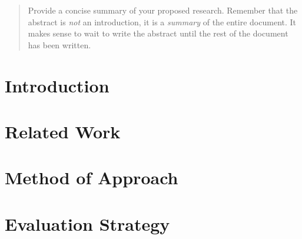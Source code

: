 \documentclass[11pt]{article}
\begin{document}

\begin{quote}

  Provide a concise summary of your proposed research. Remember that the abstract
  is {\it not\/} an introduction, it is a {\it summary\/} of the entire document.
  It makes sense to wait to write the abstract until the rest of the document has
  been written.

\end{quote}

\section{Introduction}
\label{sec:introduction}


\section{Related Work}
\label{sec:relatedwork}


\section{Method of Approach}
\label{sec:method}


\section{Evaluation Strategy}
\label{sec:evaluate}
\end{document}
